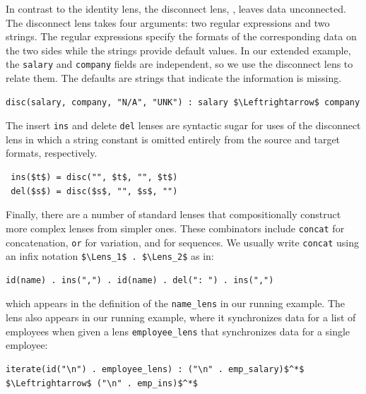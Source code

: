 \documentclass[acmsmall,screen,anonymous]{acmart}
\begin{document}
In contrast to the identity lens, the disconnect lens, \Disconnect, leaves data
unconnected. The disconnect lens takes four arguments: two regular 
expressions and two strings. The regular expressions specify the
formats of the corresponding data on the two sides while the strings provide default
values.  In our extended example, 
the \lstinline{salary} and \lstinline{company} fields are independent,
so we use the disconnect lens to relate them.
The defaults are strings that indicate the information is missing.
%
\begin{lstlisting}
disc(salary, company, "N/A", "UNK") : salary $\Leftrightarrow$ company
\end{lstlisting}
%
The insert \lstinline{ins} and delete \lstinline{del} lenses are
syntactic sugar for uses of the disconnect lens in which a string
constant is omitted entirely from the source and target formats,
respectively. 
\begin{lstlisting}
 ins($t$) = disc("", $t$, "", $t$)
 del($s$) = disc($s$, "", $s$, "")
\end{lstlisting}

Finally, there are a number of standard lenses that compositionally
construct more complex lenses from simpler ones.  These combinators include 
\lstinline{concat} for concatenation, 
\lstinline{or} for variation, and
\IterateLens for sequences.
We usually write \lstinline{concat} using an infix
notation \lstinline{$\Lens_1$ . $\Lens_2$}
as in:
%
\begin{lstlisting}
id(name) . ins(",") . id(name) . del(": ") . ins(",")
\end{lstlisting}
%
which appears in the definition of the \lstinline{name_lens} in our
running example. 
%
The \IterateLens lens also appears in our running example, where it
synchronizes data for a list of employees when given a
lens \lstinline{employee_lens} that synchronizes  data for a single employee:
%
\begin{lstlisting}
iterate(id("\n") . employee_lens) : ("\n" . emp_salary)$^*$ $\Leftrightarrow$ ("\n" . emp_ins)$^*$
\end{lstlisting}
%
\end{document}
